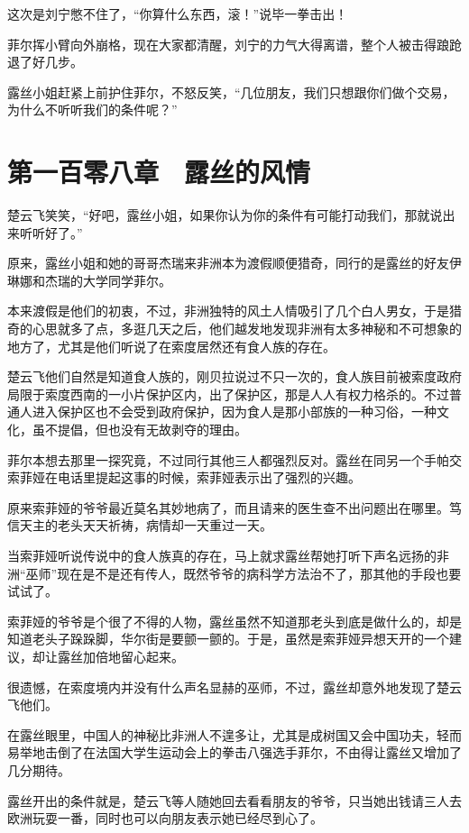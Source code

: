 这次是刘宁憋不住了，“你算什么东西，滚！”说毕一拳击出！

菲尔挥小臂向外崩格，现在大家都清醒，刘宁的力气大得离谱，整个人被击得踉跄退了好几步。

露丝小姐赶紧上前护住菲尔，不怒反笑，“几位朋友，我们只想跟你们做个交易，为什么不听听我们的条件呢？”

\section{第一百零八章　露丝的风情}

楚云飞笑笑，“好吧，露丝小姐，如果你认为你的条件有可能打动我们，那就说出来听听好了。”

原来，露丝小姐和她的哥哥杰瑞来非洲本为渡假顺便猎奇，同行的是露丝的好友伊琳娜和杰瑞的大学同学菲尔。

本来渡假是他们的初衷，不过，非洲独特的风土人情吸引了几个白人男女，于是猎奇的心思就多了点，多逛几天之后，他们越发地发现非洲有太多神秘和不可想象的地方了，尤其是他们听说了在索度居然还有食人族的存在。

楚云飞他们自然是知道食人族的，刚贝拉说过不只一次的，食人族目前被索度政府局限于索度西南的一小片保护区内，出了保护区，那是人人有权力格杀的。不过普通人进入保护区也不会受到政府保护，因为食人是那小部族的一种习俗，一种文化，虽不提倡，但也没有无故剥夺的理由。

菲尔本想去那里一探究竟，不过同行其他三人都强烈反对。露丝在同另一个手帕交索菲娅在电话里提起这事的时候，索菲娅表示出了强烈的兴趣。

原来索菲娅的爷爷最近莫名其妙地病了，而且请来的医生查不出问题出在哪里。笃信天主的老头天天祈祷，病情却一天重过一天。

当索菲娅听说传说中的食人族真的存在，马上就求露丝帮她打听下声名远扬的非洲“巫师”现在是不是还有传人，既然爷爷的病科学方法治不了，那其他的手段也要试试了。

索菲娅的爷爷是个很了不得的人物，露丝虽然不知道那老头到底是做什么的，却是知道老头子跺跺脚，华尔街是要颤一颤的。于是，虽然是索菲娅异想天开的一个建议，却让露丝加倍地留心起来。

很遗憾，在索度境内并没有什么声名显赫的巫师，不过，露丝却意外地发现了楚云飞他们。

在露丝眼里，中国人的神秘比非洲人不遑多让，尤其是成树国又会中国功夫，轻而易举地击倒了在法国大学生运动会上的拳击八强选手菲尔，不由得让露丝又增加了几分期待。

露丝开出的条件就是，楚云飞等人随她回去看看朋友的爷爷，只当她出钱请三人去欧洲玩耍一番，同时也可以向朋友表示她已经尽到心了。

